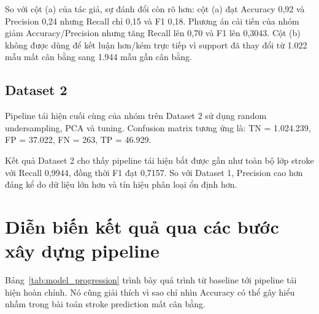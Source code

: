 So với cột (a) của tác giả, sự đánh đổi còn rõ hơn: cột (a) đạt Accuracy 0,92 và Precision 0,24 nhưng Recall chỉ 0,15 và F1 0,18. Phương án cải tiến của nhóm giảm Accuracy/Precision nhưng tăng Recall lên 0,70 và F1 lên 0,3043. Cột (b) không được dùng để kết luận hơn/kém trực tiếp vì support đã thay đổi từ 1.022 mẫu mất cân bằng sang 1.944 mẫu gần cân bằng.

\subsection{Dataset 2}

Pipeline tái hiện cuối cùng của nhóm trên Dataset 2 sử dụng random undersampling, PCA và tuning. Confusion matrix tương ứng là: TN = 1.024.239, FP = 37.022, FN = 263, TP = 46.929.

\begin{table}[H]
\centering
\small
\caption{Dataset 2: classification report của nhóm trên test giữ nguyên phân bố}
\label{tab:d2_classification_report}
\end{table}

Kết quả Dataset 2 cho thấy pipeline tái hiện bắt được gần như toàn bộ lớp stroke với Recall 0,9944, đồng thời F1 đạt 0,7157. So với Dataset 1, Precision cao hơn đáng kể do dữ liệu lớn hơn và tín hiệu phân loại ổn định hơn.

\section{Diễn biến kết quả qua các bước xây dựng pipeline}

Bảng~\ref{tab:model_progression} trình bày quá trình từ baseline tới pipeline tái hiện hoàn chỉnh. Nó cũng giải thích vì sao chỉ nhìn Accuracy có thể gây hiểu nhầm trong bài toán stroke prediction mất cân bằng.

